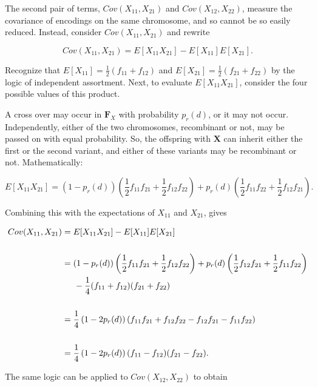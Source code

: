 \documentclass{article}
\newcommand{\m}[1]{\mathbf{#1}}               %
\begin{document}
The second pair of terms, $Cov(X_{11}, X_{21})$ and $Cov(X_{12}, X_{22})$, measure the covariance of encodings on the same chromosome, and so cannot be so easily reduced. Instead, consider $Cov(X_{11}, X_{21})$ and rewrite

$$Cov(X_{11}, X_{21}) = E[X_{11} X_{21}] - E[X_{11}]E[X_{21}].$$

\noindent Recognize that $E[X_{11}] = \frac{1}{2}(f_{11} + f_{12})$ and $E[X_{21}] = \frac{1}{2}(f_{21} + f_{22})$ by the logic of independent assortment. Next, to evaluate $E[X_{11} X_{21}]$, consider the four possible values of this product.

A cross over may occur in $\m{F}_X$ with probability $p_r(d)$, or it may not occur. Independently, either of the two chromosomes, recombinant or not, may be passed on with equal probability. So, the offspring with $\m{X}$ can inherit either the first or the second variant, and either of these variants may be recombinant or not. Mathematically:

$$E[X_{11} X_{21}] = (1 - p_r(d)) \left ( \frac{1}{2} f_{11} f_{21} + \frac{1}{2} f_{12} f_{22} \right ) + p_r(d) \left ( \frac{1}{2} f_{11} f_{22} + \frac{1}{2} f_{12} f_{21} \right ).$$

\noindent Combining this with the expectations of $X_{11}$ and $X_{21}$, gives

\begin{equation} \label{eq:covstep2}
  \begin{split}
    Cov(X_{11}, X_{21}) & = E[X_{11} X_{21}] - E[X_{11}]E[X_{21}] \\
    & \\
    & = (1 - p_r(d)) \left ( \frac{1}{2} f_{11} f_{21} + \frac{1}{2} f_{12} f_{22} \right ) + p_r(d) \left ( \frac{1}{2} f_{12} f_{21} + \frac{1}{2} f_{11} f_{22} \right ) \\
    & \hspace{0.5cm} - \frac{1}{4} (f_{11} + f_{12})(f_{21} + f_{22}) \\
    & \\
    & = \frac{1}{4} \left ( 1 - 2 p_r(d) \right ) (f_{11}f_{21} + f_{12}f_{22} - f_{12}f_{21} - f_{11}f_{22}) \\
    & \\
    & = \frac{1}{4} \left ( 1 - 2 p_r(d) \right ) (f_{11} - f_{12})(f_{21} - f_{22}) .\\
  \end{split}
\end{equation}

\noindent The same logic can be applied to $Cov(X_{12}, X_{22})$ to obtain
\end{document}

